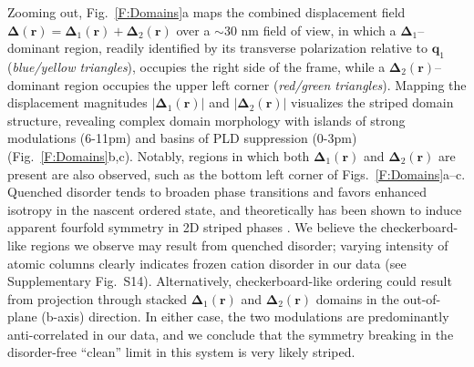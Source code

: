 \documentclass[12pt]{article}
\begin{document}
Zooming out, Fig.~\ref{F:Domains}a maps the combined displacement field $\mathbf{\Delta}(\mathbf{r})=\mathbf{\Delta}_1(\mathbf{r})+\mathbf{\Delta}_2(\mathbf{r})$ over a $\sim$30 nm field of view, in which
a $\mathbf{\Delta}_1$--dominant region, readily identified by its transverse polarization relative to $\mathbf{q}_1$ (\textit{blue/yellow triangles}), occupies the right side of the frame, while a $\mathbf{\Delta}_2(\mathbf{r})$--dominant region occupies the upper left corner (\textit{red/green triangles}).
Mapping the displacement magnitudes $\lvert\mathbf{\Delta}_1(\mathbf{r})\rvert$ and $\lvert\mathbf{\Delta}_2(\mathbf{r})\rvert$ visualizes the striped domain structure, revealing complex domain morphology with islands of strong modulations (6-11pm) and basins of PLD suppression (0-3pm) (Fig.~\ref{F:Domains}b,c).
Notably, regions in which both $\mathbf{\Delta}_1(\mathbf{r})$ and $\mathbf{\Delta}_2(\mathbf{r})$ are present are also observed, such as the bottom left corner of Figs.~\ref{F:Domains}a--c.
Quenched disorder tends to broaden phase transitions and favors enhanced isotropy in the nascent ordered state, and theoretically has been shown to induce apparent fourfold symmetry in 2D striped phases \cite{Robertson2006,DelMaestro2006,LeTacon2013}.
We believe the checkerboard-like regions we observe may result from quenched disorder; 
varying intensity of atomic columns clearly indicates frozen cation disorder in our data (see Supplementary Fig.~S14).
Alternatively, checkerboard-like ordering could result from projection through stacked $\mathbf{\Delta}_1(\mathbf{r})$ and $\mathbf{\Delta}_2(\mathbf{r})$ domains in the out-of-plane (b-axis) direction.
In either case, the two modulations are predominantly anti-correlated in our data, and we conclude that the symmetry breaking in the disorder-free ``clean'' limit in this system is very likely striped.
\end{document}
